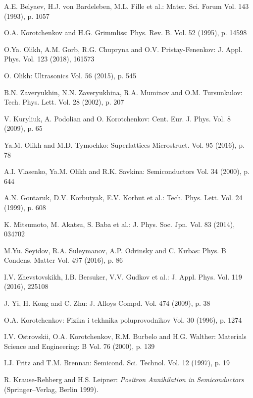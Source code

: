 \documentclass{ttp}
\begin{document}
\begin{thebibliography}{99}
 A.E. Belyaev, H.J. von Bardeleben, M.L. Fille et al.: Mater. Sci. Forum Vol. 143 (1993), p. 1057

 O.A. Korotchenkov and H.G. Grimmliss: Phys. Rev. B. Vol. 52 (1995), p. 14598

  O.Ya. Olikh, A.M. Gorb, R.G. Chupryna and O.V. Pristay-Fenenkov: J. Appl. Phys. Vol. 123 (2018), 161573

 O. Olikh: Ultrasonics Vol. 56 (2015), p. 545

 B.N. Zaveryukhin, N.N. Zaveryukhina, R.A. Muminov and O.M. Tursunkulov: Tech. Phys. Lett. Vol. 28 (2002), p. 207

 V. Kuryliuk, A. Podolian and O. Korotchenkov: Cent. Eur. J. Phys. Vol. 8 (2009), p. 65

 Ya.M. Olikh and M.D. Tymochko: Superlattices Microstruct. Vol. 95 (2016), p. 78

 A.I. Vlasenko,  Ya.M. Olikh  and R.K. Savkina: Semiconductors Vol. 34 (2000), p. 644

 A.N. Gontaruk,  D.V. Korbutyak, E.V. Korbut et al.: Tech. Phys. Lett. Vol. 24 (1999), p. 608

 K. Mitsumoto, M. Akatsu, S. Baba et al.: J. Phys. Soc. Jpn. Vol. 83 (2014), 034702

 M.Yu. Seyidov, R.A. Suleymanov, A.P. Odrinsky and C. Kırbas: Phys. B Condens. Matter Vol. 497 (2016), p. 86

 I.V. Zhevstovskikh, I.B. Bersuker, V.V. Gudkov et al.: J. Appl. Phys. Vol. 119 (2016), 225108

 J. Yi, H. Kong and C. Zhu: J. Alloys Compd. Vol. 474 (2009), p. 38

 O.A. Korotchenkov: Fizika i tekhnika poluprovodnikov Vol. 30 (1996), p. 1274

 I.V. Ostrovskii, O.A. Korotchenkov, R.M. Burbelo and H.G. Walther: Materials Science and Engineering: B Vol. 76 (2000), p. 139

 I.J. Fritz and T.M. Brennan: Semicond. Sci. Technol. Vol. 12 (1997), p. 19

 R. Krause-Rehberg and H.S. Leipner: \textit{Positron Annihilation in Semiconductors }(Springer–Verlag, Berlin 1999).


\end{thebibliography}
\end{document}
